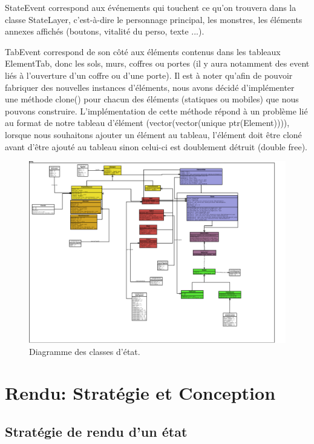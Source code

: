 \documentclass[a4paper,12pt]{article}
\begin{document}
StateEvent correspond aux événements qui touchent ce qu'on trouvera dans la classe StateLayer, c'est-à-dire le personnage principal, les monstres, les éléments annexes affichés (boutons, vitalité du perso, texte ...).

TabEvent correspond de son côté aux éléments contenus dans les tableaux ElementTab, donc les sols, murs, coffres ou portes (il y aura notamment des event liés à l'ouverture d'un coffre ou d'une porte).
\bigbreak
Il est à noter qu'afin de pouvoir fabriquer des nouvelles instances d'éléments, nous avons décidé d'implémenter une méthode clone() pour chacun des éléments (statiques ou mobiles) que nous pouvons construire. 
L'implémentation de cette méthode répond à un problème lié au format de notre tableau d'élément (vector(vector(unique ptr(Element)))), lorsque nous souhaitons ajouter un élément au tableau, l'élément doit être cloné avant d'être ajouté au tableau sinon celui-ci est doublement détruit (double free).

\begin{landscape}
\begin{figure}[p]
\includegraphics[width=0.9\paperheight]{state.pdf}
\caption{\label{state}Diagramme des classes d'état.} 
\end{figure}
\end{landscape}

\clearpage

\section{Rendu: Stratégie et Conception}

\subsection{Stratégie de rendu d'un état}
\end{document}
